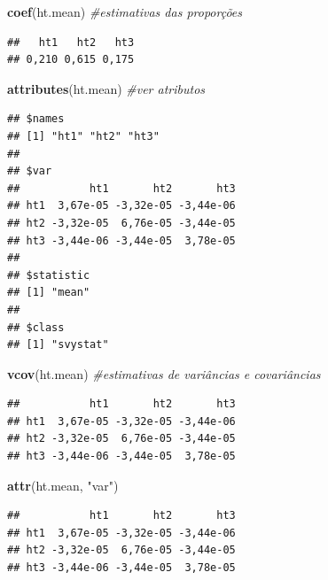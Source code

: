\documentclass[]{book}
\newenvironment{Shaded}{\begin{snugshade}}{\end{snugshade}}
\newcommand{\KeywordTok}[1]{\textcolor[rgb]{0.13,0.29,0.53}{\textbf{#1}}}
\newcommand{\StringTok}[1]{\textcolor[rgb]{0.31,0.60,0.02}{#1}}
\newcommand{\CommentTok}[1]{\textcolor[rgb]{0.56,0.35,0.01}{\textit{#1}}}
\newcommand{\NormalTok}[1]{#1}
\theoremstyle{definition}
\theoremstyle{definition}
\theoremstyle{definition}
\theoremstyle{remark}
\begin{document}
\begin{Shaded}
\begin{Highlighting}[]
\KeywordTok{coef}\NormalTok{(ht.mean)                         }\CommentTok{#estimativas das proporções}
\end{Highlighting}
\end{Shaded}

\begin{verbatim}
##   ht1   ht2   ht3 
## 0,210 0,615 0,175
\end{verbatim}

\begin{Shaded}
\begin{Highlighting}[]
\KeywordTok{attributes}\NormalTok{(ht.mean)                          }\CommentTok{#ver atributos}
\end{Highlighting}
\end{Shaded}

\begin{verbatim}
## $names
## [1] "ht1" "ht2" "ht3"
## 
## $var
##           ht1       ht2       ht3
## ht1  3,67e-05 -3,32e-05 -3,44e-06
## ht2 -3,32e-05  6,76e-05 -3,44e-05
## ht3 -3,44e-06 -3,44e-05  3,78e-05
## 
## $statistic
## [1] "mean"
## 
## $class
## [1] "svystat"
\end{verbatim}

\begin{Shaded}
\begin{Highlighting}[]
\KeywordTok{vcov}\NormalTok{(ht.mean)                         }\CommentTok{#estimativas de variâncias e covariâncias}
\end{Highlighting}
\end{Shaded}

\begin{verbatim}
##           ht1       ht2       ht3
## ht1  3,67e-05 -3,32e-05 -3,44e-06
## ht2 -3,32e-05  6,76e-05 -3,44e-05
## ht3 -3,44e-06 -3,44e-05  3,78e-05
\end{verbatim}

\begin{Shaded}
\begin{Highlighting}[]
\KeywordTok{attr}\NormalTok{(ht.mean, }\StringTok{"var"}\NormalTok{)}
\end{Highlighting}
\end{Shaded}

\begin{verbatim}
##           ht1       ht2       ht3
## ht1  3,67e-05 -3,32e-05 -3,44e-06
## ht2 -3,32e-05  6,76e-05 -3,44e-05
## ht3 -3,44e-06 -3,44e-05  3,78e-05
\end{verbatim}
\end{document}
